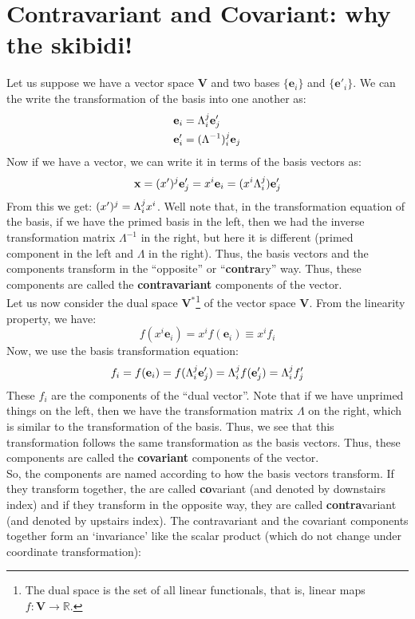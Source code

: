 \section{Contravariant and Covariant: why the skibidi!}
Let us suppose we have a vector space $\mathbf{V}$ and two bases $\{\mathbf{e}_i\}$ and $\{\mathbf{e}'_i\}$. We can the write the transformation of the basis into one another as:
\begin{align*}
    \mathbf{e}_i &= \tensor*{\Lambda}{^j_i}\mathbf{e}'_j\\
    \mathbf{e}'_i &= \tensor*{(\Lambda^{-1})}{_i^j}\mathbf{e}_j
\end{align*}
Now if we have a vector, we can write it in terms of the basis vectors as:
$$\mathbf{x} =  (x')^j \mathbf{e}'_j = x^i \mathbf{e}_i = (x^i \tensor*{\Lambda}{^j_i}) \mathbf{e}'_j $$
From this we get: $(x')^j = \tensor*{\Lambda}{^j_i} x^i$. Well note that, in the transformation equation of the basis, if we have the primed basis in the left, then we had the inverse transformation matrix $\Lambda^{-1}$ in the right, but here it is different (primed component in the left and $\Lambda$ in the right). Thus, the basis vectors and the components transform in the ``opposite'' or ``\textbf{contra}ry'' way. Thus, these components are called the \textbf{contravariant} components of the vector.\\[0.3cm]
Let us now consider the dual space $\mathbf{V}^*$\footnote{The dual space is the set of all linear functionals, that is, linear maps $f: \mathbf{V} \to \mathbb{R}$.} of the vector space $\mathbf{V}$. From the linearity property, we have:
$$f(x^i\mathbf{e}_i) = x^i f(\mathbf{e}_i) \equiv x^i f_i$$
Now, we use the basis transformation equation:
$$f_i = f(\mathbf{e}_i) = f(\tensor*{\Lambda}{^j_i}\mathbf{e}'_j) = \tensor*{\Lambda}{^j_i}f(\mathbf{e}'_j) = \tensor*{\Lambda}{^j_i}f'_j$$
These $f_i$ are the components of the ``dual vector''. Note that if we have unprimed things on the left, then we have the transformation matrix $\Lambda$ on the right, which is similar to the transformation of the basis. Thus, we see that this transformation follows the same transformation as the basis vectors. Thus, these components are called the \textbf{covariant} components of the vector.\\[0.3cm]
So, the components are named according to how the basis vectors transform. If they transform together, the are called \textbf{co}variant (and denoted by downstairs index) and if they transform in the opposite way, they are called \textbf{contra}variant (and denoted by upstairs index). The contravariant and the covariant components together form an `invariance' like the scalar product (which do not change under coordinate transformation):
